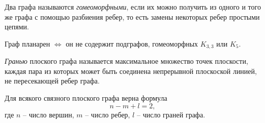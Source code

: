 \begin{definition}
    Два графа называются \emph{гомеоморфными}, если их можно получить из одного и того же графа с помощью разбиения ребер, то есть замены некоторых ребер простыми цепями.
\end{definition}

\begin{theorem}
    Граф планарен $ \iff $ он не содержит подграфов, гомеоморфных $ K_{3,3} $ или $ K_5 $.
\end{theorem}

\begin{definition}[Грань]
    \emph{Гранью} плоского графа называется максимальное множество точек плоскости, каждая пара из которых может быть соединена непрерывной плоскоской линией, не пересекающей ребер графа.
\end{definition}

\begin{theorem}
    Для всякого связного плоского графа верна формула
    \begin{equation}\label{eq:2}
        n-m+l=2,
    \end{equation}
    где $ n $ -- число вершин, $ m $ -- число ребер, $ l $ -- число граней графа.
\end{theorem}
